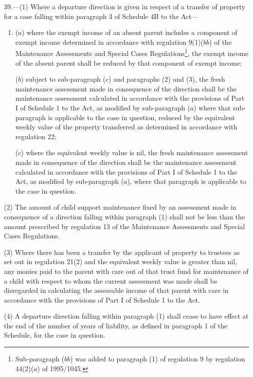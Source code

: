 \documentclass[a4paper]{article}
\begin{document}
39.—(1) Where a departure direction is given in respect of a transfer of property for a case falling within paragraph 3 of Schedule 4B to the Act—
\begin{enumerate}\item[]
($a$) where the exempt income of an absent parent includes a component of exempt income determined in accordance with regulation 9(1)($bb$) of the Maintenance Assessments and Special Cases Regulations\footnote{\frenchspacing Sub-paragraph ($bb$) was added to paragraph (1) of regulation 9 by regulation 44(2)($a$) of 1995/1045.}, the exempt income of the absent parent shall be reduced by that component of exempt income;

($b$) subject to sub-paragraph ($c$) and paragraphs (2) and (3), the fresh maintenance assessment made in consequence of the direction shall be the maintenance assessment calculated in accordance with the provisions of Part I of Schedule 1 to the Act, as modified by sub-paragraph ($a$) where that sub-paragraph is applicable to the case in question, reduced by the equivalent weekly value of the property transferred as determined in accordance with regulation 22;

($c$) where the equivalent weekly value is nil, the fresh maintenance assessment made in consequence of the direction shall be the maintenance assessment calculated in accordance with the provisions of Part I of Schedule 1 to the Act, as modified by sub-paragraph ($a$), where that paragraph is applicable to the case in question.
\end{enumerate}

(2) The amount of child support maintenance fixed by an assessment made in consequence of a direction falling within paragraph (1) shall not be less than the amount prescribed by regulation 13 of the Maintenance Assessments and Special Cases Regulations.

(3) Where there has been a transfer by the applicant of property to trustees as set out in regulation 21(2) and the equivalent weekly value is greater than nil, any monies paid to the parent with care out of that trust fund for maintenance of a child with respect to whom the current assessment was made shall be disregarded in calculating the assessable income of that parent with care in accordance with the provisions of Part I of Schedule 1 to the Act.

(4) A departure direction falling within paragraph (1) shall cease to have effect at the end of the number of years of liability, as defined in paragraph 1 of the Schedule, for the case in question.
\end{document}
